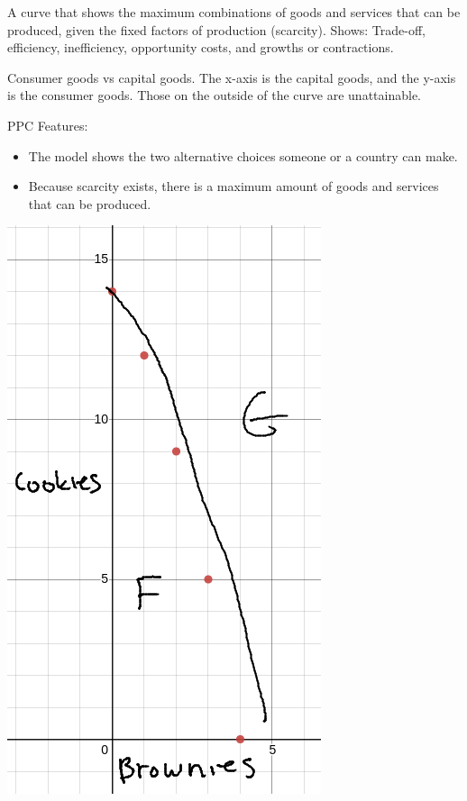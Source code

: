 \documentclass{scrreprt} %
\begin{document}
\begin{definition}
	A curve that shows the maximum combinations of goods and services
	that can be produced, given the fixed factors of production (scarcity).
	Shows: Trade-off, efficiency, inefficiency, opportunity costs, and growths or contractions.

	Consumer goods vs capital goods. The x-axis is the capital goods, and the
	y-axis is the consumer goods. Those on the outside of the curve are unattainable.

	PPC Features:

	\begin{itemize}
		\item The model shows the two alternative choices someone or a country
		can make.
		\item Because scarcity exists, there is a maximum amount of goods and
		services that can be produced.
	\end{itemize}
	\includegraphics[scale=0.4]{2021-08-24-13-20-08.png}
	

\end{definition}
\end{document}
